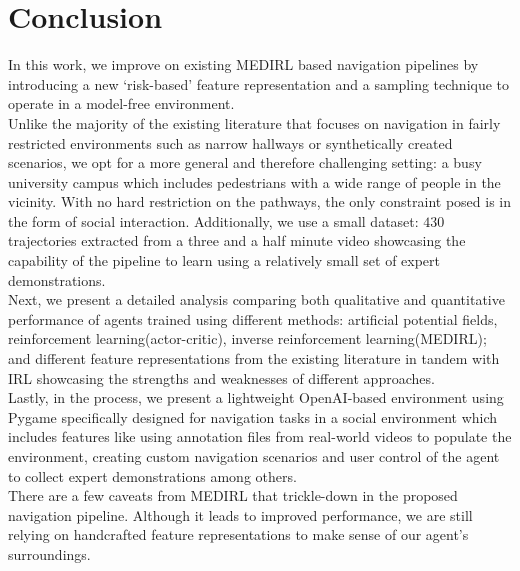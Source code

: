 \label{ch:conclusion}
\section{Conclusion}
In this work, we improve on existing MEDIRL based navigation pipelines by introducing a new `risk-based' feature representation and a sampling technique to operate in a model-free environment. \\
Unlike the majority of the existing literature that focuses on navigation in fairly restricted environments such as narrow hallways or synthetically created scenarios, we opt for a more general and therefore challenging setting: a busy university campus which includes pedestrians with a wide range of people in the vicinity. With no hard restriction on the pathways, the only constraint posed is in the form of social interaction. Additionally, we use a small dataset: $430$ trajectories extracted from a three and a half minute video showcasing the capability of the pipeline to learn using a relatively small set of expert demonstrations.\\
Next, we present a detailed analysis comparing both qualitative and quantitative performance of agents trained using different methods: artificial potential fields, reinforcement learning(actor-critic), inverse reinforcement learning(MEDIRL); and different feature representations from the existing literature in tandem with IRL showcasing the strengths and weaknesses of different approaches.\\
Lastly, in the process, we present a lightweight OpenAI-based environment using Pygame specifically designed for navigation tasks in a social environment which includes features like using annotation files from real-world videos to populate the environment, creating custom navigation scenarios and user control of the agent to collect expert demonstrations among others. \\
There are a few caveats from MEDIRL that trickle-down in the proposed navigation pipeline. Although it leads to improved performance, we are still relying on handcrafted feature representations to make sense of our agent's surroundings. \\

